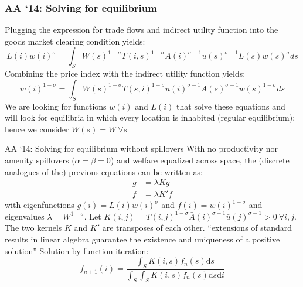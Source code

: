 \documentclass[11pt,notes=hide,aspectratio=169]{beamer}
\begin{document}
\begin{frame}
\frametitle{AA `14: Solving for equilibrium}
Plugging the expression for trade flows and indirect utility function into the goods market clearing condition yields:
\begin{equation*}
L(i)w(i)^{\sigma}=\int_{S} W(s)^{1-\sigma} T(i,s)^{1-\sigma}A(i)^{\sigma-1}u(s)^{\sigma-1}L(s)w(s)^{\sigma}ds 
\end{equation*}
Combining the price index with the indirect utility function yields:
\begin{equation*}
w(i)^{1-\sigma}=\int_{S} W(s)^{1-\sigma} T(s,i)^{1-\sigma}u\left(i\right)^{\sigma-1}A(s)^{\sigma-1}w(s)^{1-\sigma}ds 
\end{equation*}
We are looking for functions $w(i)$ and $ L(i)$ that solve these equations and will look for equilibria in which every location is inhabited (regular equilibrium); hence we consider $W(s) = W \ \forall s$
\end{frame}
\begin{frame}{AA `14: Solving for equilibrium without spillovers}
With no productivity nor amenity spillovers ($\alpha=\beta=0$) and welfare equalized across space, the (discrete analogues of the) previous equations can be written as:
\begin{align*}
g &= \lambda K g \\
f &= \lambda K' f
\end{align*}
with eigenfunctions $g(i) = L(i) w(i)^{\sigma}$ and $f(i) = w(i)^{1-\sigma}$
and eigenvalues $\lambda=W^{1-\sigma}$.
Let $K(i,j) = T(i,j)^{1-\sigma} \bar{A}(i)^{\sigma-1} \bar{u}(j)^{\sigma-1}  > 0 \ \forall i,j$.
The two kernels $K$ and $K'$ are transposes of each other.
``extensions of standard results in linear algebra guarantee the existence and uniqueness of a positive solution''
Solution by function iteration: 
$$
f_{n+1}(i) = \frac{\int_{S}K(i,s)f_n(s)\textrm{d}s}{\int_{S}\int_{S}K(i,s)f_n(s)\textrm{d}s\textrm{d}i}
$$
\end{frame}
\end{document}
